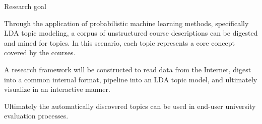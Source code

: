 \begin{frame}{Research goal}

  \vfill

  Through the application of probabilistic machine learning methods,
  specifically LDA topic modeling, a corpus of unstructured course
  descriptions can be digested and mined for topics. In this scenario, each
  topic represents a core concept covered by the courses.

  \vfill

  A research framework will be constructed to read data from the
  Internet, digest into a common internal format, pipeline into an LDA
  topic model, and ultimately visualize in an interactive manner.

  \vfill

  Ultimately the automatically discovered topics can be used in
  end-user university evaluation processes.

  \vfill

\end{frame}
